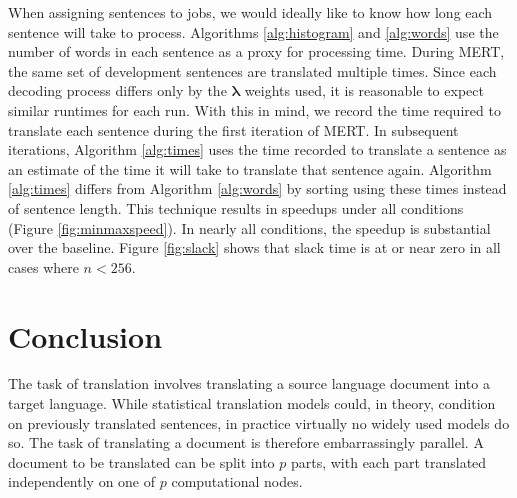 \documentclass{pbml}
\begin{document}
When assigning sentences to jobs, we would ideally like to know how long each sentence will take to process. Algorithms \ref{alg:histogram} and \ref{alg:words} use the number of words in each sentence as a proxy for processing time. During MERT, the same set of development sentences are translated multiple times. Since each decoding process differs only by the $\bm{\lambda}$ weights used, it is reasonable to expect similar runtimes for each run. With this in mind, we record the time required to translate each sentence during the first iteration of MERT. In subsequent iterations, Algorithm \ref{alg:times} uses the time recorded to translate a sentence as an estimate of the time it will take to translate that sentence again. Algorithm \ref{alg:times} differs from Algorithm \ref{alg:words} by sorting using these times instead of sentence length.
%
This technique results in speedups under all conditions (Figure \ref{fig:minmaxspeed}). In nearly all conditions, the speedup is substantial over the baseline. 
%
Figure \ref{fig:slack} shows that slack time is at or near zero in all cases where $n<256$.
%



\section{Conclusion}
The task of translation involves translating a source language document into a target language. 
%
While statistical translation models could, in theory, condition on previously translated sentences, in practice virtually no widely used models do so.
%
The task of translating a document is therefore embarrassingly parallel.
%
A document to be translated can be split into $p$ parts, with each part translated independently on one of $p$ computational nodes.
\end{document}
